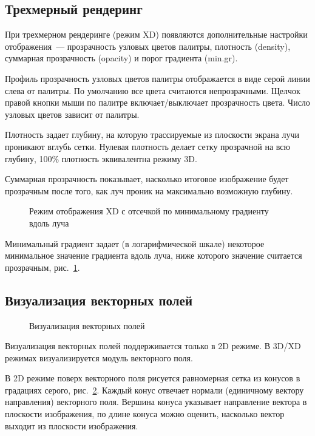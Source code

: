 \documentclass[12pt]{article}
\begin{document}
\subsection{Трехмерный рендеринг}
При трехмерном рендеринге (режим XD) появляются дополнительные настройки отображения~--- прозрачность узловых цветов палитры,
плотность (density), суммарная прозрачность (opacity) и порог градиента (min.gr).

Профиль прозрачность узловых цветов палитры отображается в виде серой линии слева от палитры. По умолчанию все цвета считаются непрозрачными.
Щелчок правой кнопки мыши по палитре включает/выключает прозрачность цвета. Число узловых цветов зависит от палитры.

Плотность задает глубину, на которую трассируемые из плоскости экрана лучи проникают вглубь сетки. Нулевая плотность
делает сетку прозрачной на всю глубину, 100\% плотность эквивалентна режиму 3D.

Суммарная прозрачность показывает, насколько итоговое изображение будет прозрачным после того, как луч проник на максимально возможную глубину.

\begin{figure}[hb]
  \begin{center}
  \end{center}
  \caption{Режим отображения XD с отсечкой по минимальному градиенту вдоль луча}\label{XD:grad:pict}
\end{figure}

Минимальный градиент задает (в логарифмической шкале) некоторое минимальное значение градиента вдоль луча, ниже которого значение считается прозрачным, рис.~\ref{XD:grad:pict}.

\subsection{Визуализация векторных полей}
\begin{figure}[h]
  \begin{center}
  \end{center}
  \caption{Визуализация векторных полей}\label{2D:grad:pict}
\end{figure}
Визуализация векторных полей поддерживается только в 2D режиме.
В 3D/XD режимах визуализируется модуль векторного поля. 

В 2D режиме поверх векторного поля рисуется равномерная сетка из конусов в градациях серого, рис.~\ref{2D:grad:pict}.
Каждый конус отвечает нормали (единичному вектору направления) векторного поля.
Вершина конуса указывает направление вектора в плоскости
изображения, по длине конуса можно оценить, насколько вектор выходит из плоскости изображения.
\end{document}
